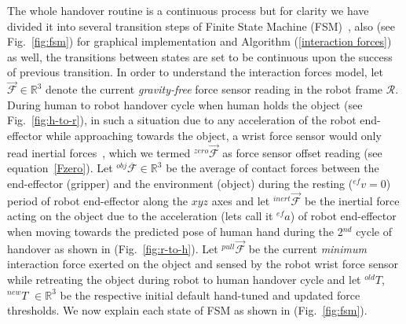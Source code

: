 The whole handover routine is a continuous process but for clarity we have divided it into several transition steps of Finite State Machine (FSM)~\cite{johnson1968automatic}, also (see Fig.~\ref{fig:fsm}) for graphical implementation and Algorithm (\ref{interaction forces}) as well, the transitions between states are set to be continuous upon the success of previous transition. In order to understand the interaction forces model, let $\mathcal{\vec{F}}\in \mathbb{R}^3$ denote the current \textit{gravity-free} force sensor reading in the robot frame $\mathcal{R}$. During human to robot handover cycle when human holds the object (see Fig.~\ref{fig:h-to-r}), in such a situation due to any acceleration of the robot end-effector while approaching towards the object, a wrist force sensor would only read inertial forces~\cite{spong2008robot}, which we termed ${}^{zero}\vec{\mathcal{F}}$ as force sensor offset reading (see equation~\ref{Fzero}). Let ${}^{obj}\overline{\mathcal{F}}\in \mathbb{R}^3$ be the average of contact forces between the end-effector (gripper) and the environment (object) during the resting (${}^{ef}v=0$) period of robot end-effector along the $xyz$ axes and let ${}^{inert}\vec{\mathcal{F}}$ be the inertial force acting on the object due to the acceleration (lets call it ${}^{ef}a$) of robot end-effector when moving towards the predicted pose of human hand during the 2$^{nd}$ cycle of handover as shown in (Fig.~\ref{fig:r-to-h}). Let ${}^{pull}\vec{\mathcal{F}}$ be the current \textit{minimum} interaction force exerted on the object and sensed by the robot wrist force sensor while retreating the object during robot to human handover cycle and let ${}^{old}T$, ${}^{new}T$ $\in \mathbb{R}^3$ be the respective initial default hand-tuned and updated force thresholds. We now explain each state of FSM as shown in (Fig.~\ref{fig:fsm}).



